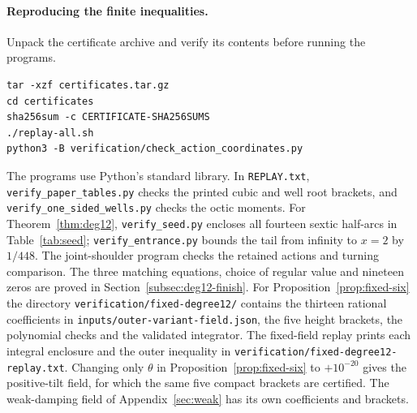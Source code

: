 \paragraph{Reproducing the finite inequalities.}
Unpack the certificate archive and verify its contents before running the programs.
\begin{verbatim}
tar -xzf certificates.tar.gz
cd certificates
sha256sum -c CERTIFICATE-SHA256SUMS
./replay-all.sh
python3 -B verification/check_action_coordinates.py
\end{verbatim}
The programs use Python's standard library. In \texttt{REPLAY.txt},
\texttt{verify\_paper\_tables.py} checks the printed cubic and well
root brackets, and \texttt{verify\_one\_sided\_wells.py} checks the
octic moments. For Theorem~\ref{thm:deg12}, \texttt{verify\_seed.py}
encloses all fourteen sextic half-arcs in Table~\ref{tab:seed};
\texttt{verify\_entrance.py} bounds the tail from infinity to $x=2$
by $1/448$. The joint-shoulder program checks the retained actions and
turning comparison. The three matching equations, choice of regular
value and nineteen zeros are proved in Section~\ref{subsec:deg12-finish}.
For Proposition~\ref{prop:fixed-six} the directory
\nolinkurl{verification/fixed-degree12/} contains the thirteen rational
coefficients in \nolinkurl{inputs/outer-variant-field.json}, the five
height brackets, the polynomial checks and the validated integrator.
The fixed-field replay prints each integral enclosure and the outer
inequality in \nolinkurl{verification/fixed-degree12-replay.txt}.
Changing only $\theta$ in Proposition~\ref{prop:fixed-six} to
$+10^{-20}$ gives the positive-tilt field, for which the same five
compact brackets are certified. The weak-damping field of
Appendix~\ref{sec:weak} has its own coefficients and brackets.
